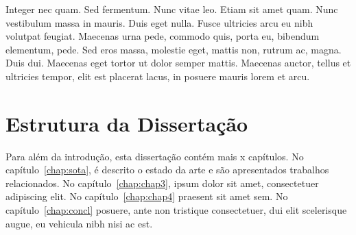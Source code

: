 Integer nec quam. Sed fermentum. Nunc vitae leo. Etiam sit amet
quam. Nunc vestibulum massa in mauris. Duis eget nulla. Fusce
ultricies arcu eu nibh volutpat feugiat. Maecenas urna pede, commodo
quis, porta eu, bibendum elementum, pede. Sed eros massa, molestie
eget, mattis non, rutrum ac, magna. Duis dui. Maecenas eget tortor ut
dolor semper mattis. Maecenas auctor, tellus et ultricies tempor, elit
est placerat lacus, in posuere mauris lorem et arcu. 

\section{Estrutura da Dissertação} \label{sec:struct}

Para além da introdução, esta dissertação contém mais x capítulos.
No capítulo~\ref{chap:sota}, é descrito o estado da arte e são
apresentados trabalhos relacionados. 
No capítulo~\ref{chap:chap3}, ipsum dolor sit amet, consectetuer
adipiscing elit.
No capítulo~\ref{chap:chap4} praesent sit amet sem. 
No capítulo~\ref{chap:concl}  posuere, ante non tristique
consectetuer, dui elit scelerisque augue, eu vehicula nibh nisi ac
est. 
